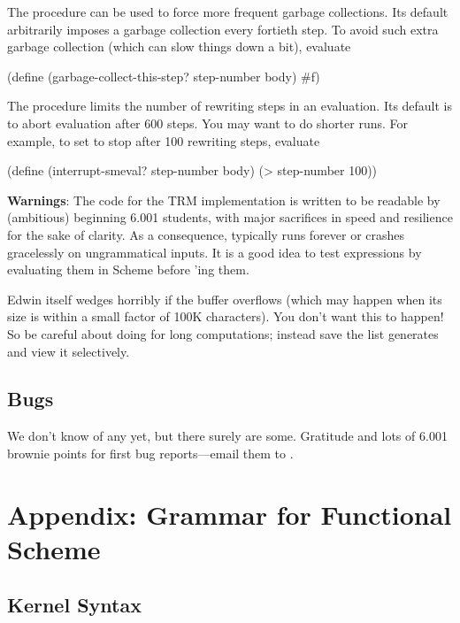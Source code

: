 \documentclass[11pt]{article}
\begin{document}
The procedure  can be used to force more
frequent garbage collections.  Its default arbitrarily imposes a garbage
collection every fortieth step.  To avoid such extra garbage collection
(which can slow things down a bit), evaluate
\begin{lisp}
(define (garbage-collect-this-step? step-number body) #f)
\end{lisp}

The procedure  limits the number of rewriting
steps in an evaluation.  Its default is to abort evaluation after 600
steps.  You may want to do shorter runs.  For example, to set
 to stop after 100 rewriting steps, evaluate
\begin{lisp}
(define (interrupt-smeval? step-number body) (> step-number 100))
\end{lisp}

{\bf Warnings}:
The code for the TRM implementation is written to be readable by
(ambitious) beginning 6.001 students, with major sacrifices in speed and
resilience for the sake of clarity.  As a consequence, 
typically runs forever or crashes gracelessly on ungrammatical inputs.  It
is a good idea to test expressions by evaluating them in Scheme before
'ing them.

Edwin itself wedges horribly if the  buffer overflows
(which may happen when its size is within a small factor of 100K
characters).  You don't want this to happen!  So be careful about doing
 for long computations; instead save the list
 generates and view it selectively.

\subsection{Bugs}

We don't know of any yet, but there surely are some.  Gratitude and lots
of 6.001 brownie points for first bug reports---email them to
.

\section{Appendix: Grammar for Functional Scheme}

\subsection{Kernel Syntax}
\end{document}
